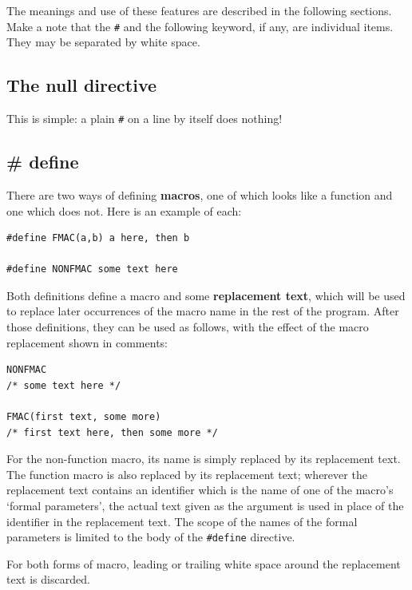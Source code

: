   The meanings and use of these features are described in the following
   sections. Make a note that the \texttt{\#} and the following keyword,
   if any, are individual items. They may be separated by white space.


  \subsection{The null directive}
   

   This is simple: a plain \texttt{\#} on a line by itself does
    nothing!


  

  \subsection{\# define}
   

   There are two ways of defining \textbf{macros}, one of which looks
    like a function and one which does not. Here is an example of each:


   \begin{Verbatim}
#define FMAC(a,b) a here, then b

#define NONFMAC some text here
\end{Verbatim}

   Both definitions define a macro and some \textbf{replacement text},
    which will be used to replace later occurrences of the macro name in the
    rest of the program. After those definitions, they can be used as
    follows, with the effect of the macro replacement shown in comments:


   \begin{Verbatim}
NONFMAC
/* some text here */

FMAC(first text, some more)
/* first text here, then some more */
\end{Verbatim}

   For the non-function macro, its name is simply replaced by its
    replacement text. The function macro is also replaced by its replacement
    text; wherever the replacement text contains an identifier which is the
    name of one of the macro's `formal parameters', the actual text
    given as the argument is used in place of the identifier in the
    replacement text. The scope of the names of the formal parameters is
    limited to the body of the \texttt{\#define} directive.


   For both forms of macro, leading or trailing white space around the
    replacement text is discarded.


